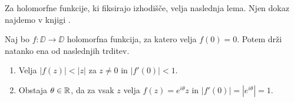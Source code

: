 
Za holomorfne funkcije, ki fiksirajo izhodišče, velja naslednja lema. Njen dokaz najdemo v knjigi \cite[lema 1]{Globevnik_2010}.

\begin{lema}[Schwarz] \label{lem:schwarz}
    Naj bo \(f \colon \DD \to \DD\) holomorfna funkcija, za katero velja \(f (0) = 0\). Potem drži natanko ena od naslednjih trditev.
    \begin{enumerate}
        \item Velja \(|f (z)| < |z|\) za \(z \neq 0\) in \(|f' (0)| < 1\).
        \item Obstaja \(\theta \in \mathbb R\), da za vsak \(z\) velja \(f (z) = e^{i \theta} z\) in \(|f' (0)| = |e^{i \theta}| = 1\).
    \end{enumerate}
\end{lema}

